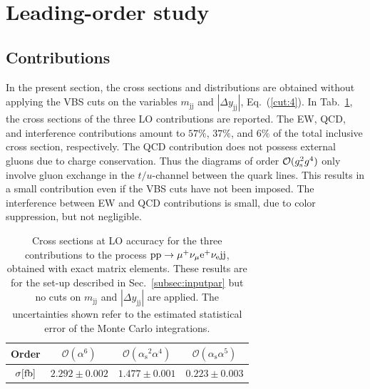 \documentclass[twocolumn,epjc3]{svjour3} %
\newcommand{\Pj}{\ensuremath{\text{j}}\xspace}
\newcommand{\alphas}{\ensuremath{\alpha_\text{s}}\xspace}
\begin{document}
\section{Leading-order study}
    \label{sec:LO}
    \subsection{Contributions}
        \label{subsec:contributions}
    In the present section, the cross sections and distributions are obtained without applying the VBS cuts on the variables $m_{\Pj\Pj}$ and $|\Delta y_{\Pj\Pj}|$, 
    Eq.~(\ref{cut:4}).
    In Tab.~\ref{tab:LOscanXsec}, the cross sections of the three LO contributions are reported.
    The EW, QCD, and interference contributions amount to $57\%$, $37\%$, and $6\%$ of the total inclusive cross section, respectively.
    The QCD contribution does not possess external gluons due to charge conservation.
    Thus the diagrams of order $\mathcal{O}(g_{\rm s}^2g^4)$ only involve gluon exchange in the $t/u$-channel between the quark lines.
    This results in a small contribution even if the VBS cuts have not been imposed.
    The interference between EW and QCD contributions is small, due to color suppression, but not negligible.

    \begin{table}[h!]
        \centering
        \begin{tabular}{c|c|c|c}
            Order & $\mathcal{O}(\alpha^6)$ & $\mathcal{O}(\alphas^2\alpha^4)$ & $\mathcal{O}(\alphas\alpha^5)$ \\
            \hline
            \hline
            $\sigma[\rm{fb}]$ & $ 2.292 \pm 0.002 $ & $ 1.477 \pm 0.001 $ & $ 0.223 \pm 0.003 $ \\
        \end{tabular}
        \caption{\label{tab:LOscanXsec} Cross sections at LO accuracy for the three contributions to the process ${\rm p}{\rm p}\to\mu^+\nu_\mu{\rm e}^+\nu_{\rm e}{\rm j}{\rm j}$, obtained with exact matrix elements.
        These results are for the set-up described in Sec.~\protect\ref{subsec:inputpar} but no cuts on $m_{\Pj\Pj}$ and $|\Delta y_{\Pj\Pj}|$ are applied.
        The uncertainties shown refer to the estimated statistical error of the Monte Carlo integrations.}
    \end{table}
\end{document}
